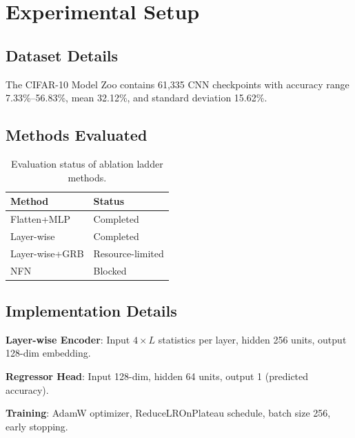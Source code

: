 \section{Experimental Setup}

\subsection{Dataset Details}

The CIFAR-10 Model Zoo contains 61,335 CNN checkpoints with accuracy range 7.33\%--56.83\%, mean 32.12\%, and standard deviation 15.62\%.

\subsection{Methods Evaluated}

\begin{table}[h]
\centering
\begin{tabular}{@{}ll@{}}
\toprule
Method & Status \\
\midrule
Flatten+MLP & Completed \\
Layer-wise & Completed \\
Layer-wise+GRB & Resource-limited \\
NFN & Blocked \\
\bottomrule
\end{tabular}
\caption{Evaluation status of ablation ladder methods.}
\label{tab:methods-status}
\end{table}

\subsection{Implementation Details}

\textbf{Layer-wise Encoder}: Input $4 \times L$ statistics per layer, hidden 256 units, output 128-dim embedding.

\textbf{Regressor Head}: Input 128-dim, hidden 64 units, output 1 (predicted accuracy).

\textbf{Training}: AdamW optimizer, ReduceLROnPlateau schedule, batch size 256, early stopping.
